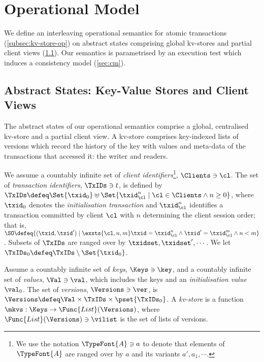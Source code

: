 \section{Operational Model}
\label{sec:model}

We define an interleaving operational semantics for atomic transactions (\cref{subsec:kv-store-op}) on
abstract states comprising global kv-stores and partial client views (\cref{subsec:kvstores}). 
Our semantics is parametrised by an execution test which induces a
consistency model  (\cref{sec:cm}).

\subsection{Abstract States: Key-Value Stores and Client Views}
\label{subsec:kvstores}
\label{sec:mkvs-view}
The abstract states of our operational semantics comprise 
a  global, centralised kv-store and a partial client view.  A
kv-store comprises key-indexed lists of versions which record
the history of the key with values and meta-data of the
transactions that accessed it: the writer and readers.

We assume a countably infinite set of \emph{client identifiers}\footnote{ We use the notation
 \(\TypeFont{A} \ni a\) to denote that elements of \(\TypeFont{A}\) are ranged over
  by \(a\) and its variants \(a', a_1, \cdots\).},
\(\Clients \ni \cl\).
The set of \emph{transaction identifiers}, \(\TxIDs \ni t\), 
 is defined by
\(\TxIDs \defeq  \Set{\txid_{0}} \uplus \Set{ \txid_{\cl}^{n} \mid \cl \in \Clients \land n \geq 0 }\), 
where  \(\txid_0\) denotes  the  \emph{initialisation transaction}
and \(\txid_{\cl}^{n}\) identifies a transaction committed by client
\(\cl\) with \(n\)  determining  the client session order; that is, 
\(\SO \defeq \{ (\txid, \txid') \mid \exsts{ \cl, n,m } \txid = \txid_{\cl}^{n} \land \allowbreak \txid' = \txid_{\cl}^{m} \land \allowbreak n < m\}\).
Subsets of \(\TxIDs\)  are ranged over by \(\txidset, \txidset', \cdots\). 
We let \(\TxIDs_{0} \defeq \TxIDs \setminus \Set{\txid_0}\). 

\SpaceAboveDef
\begin{definition}[Kv-stores]
\label{def:his_heap}
\label{def:mkvs}
Assume a countably infinite set of \emph{keys}, \(\Keys \ni \key\), 
and a countably infinite set of  \emph{values}, \(\Val \ni \val\), 
which includes the keys and an \emph{initialisation value} \(\val_0\).
The set of \emph{versions}, \(\Versions \ni \ver\), is \(\Versions \defeq \Val \times \TxIDs \times \pset{\TxIDs_{0}}\). 
A \emph{kv-store} 
is a function \(\mkvs: \Keys \to \Func{List}(\Versions)\), 
where \(\Func{List}(\Versions) \ni \vilist\) is the set of lists of versions.
\end{definition}
\SpaceBelowDef

